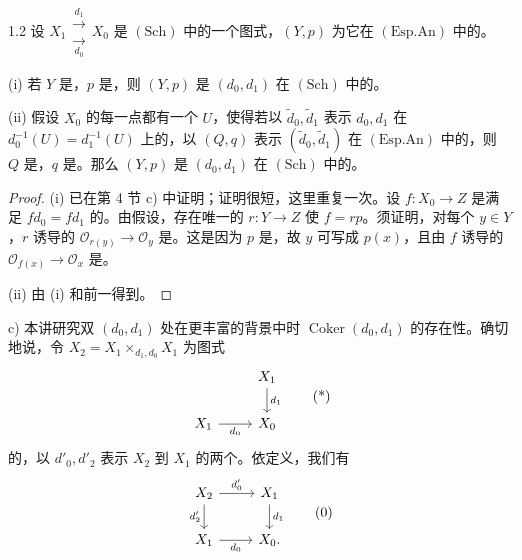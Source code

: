 \begin{SGAresult}{}{1.2}
设 $X_1\mathrel{\substack{\xrightarrow{d_1}\\[-.6ex]\xrightarrow[d_0]{}}}X_0$ 是 $(\mathrm{Sch})$ 中的一个图式，$(Y,p)$ 为它在 $(\mathrm{Esp.An})$ 中的。

(i) 若 $Y$ 是，$p$ 是，则 $(Y,p)$ 是 $(d_0,d_1)$ 在 $(\mathrm{Sch})$ 中的。

(ii) 假设 $X_0$ 的每一点都有一个 $U$，使得若以 $\widetilde d_0,\widetilde d_1$ 表示 $d_0,d_1$ 在 $d_0^{-1}(U)=d_1^{-1}(U)$ 上的，以 $(Q,q)$ 表示 $(\widetilde d_0,\widetilde d_1)$ 在 $(\mathrm{Esp.An})$ 中的，则 $Q$ 是，$q$ 是。那么 $(Y,p)$ 是 $(d_0,d_1)$ 在 $(\mathrm{Sch})$ 中的。
\end{SGAresult}
\begin{proof}
(i) 已在第 4 节 c) 中证明；证明很短，这里重复一次。设 $f:X_0\to Z$ 是满足 $fd_0=fd_1$ 的。由假设，存在唯一的 $r:Y\to Z$ 使 $f=rp$。须证明，对每个 $y\in Y$，$r$ 诱导的 $\mathcal O_{r(y)}\to\mathcal O_y$ 是。这是因为 $p$ 是，故 $y$ 可写成 $p(x)$，且由 $f$ 诱导的 $\mathcal O_{f(x)}\to\mathcal O_x$ 是。

(ii) 由 (i) 和前一得到。
\end{proof}
c) 本讲研究双 $(d_0,d_1)$ 处在更丰富的背景中时 $\operatorname{Coker}(d_0,d_1)$ 的存在性。确切地说，令 $X_2=X_1\times_{d_1,d_0}X_1$ 为图式
\[
\begin{tikzcd}
&X_1\arrow[d,"d_1"]\\
X_1\arrow[r,"d_0"']&X_0
\end{tikzcd}\tag{*}
\]
的，以 $d'_0,d'_2$ 表示 $X_2$ 到 $X_1$ 的两个。依定义，我们有
\[
\begin{tikzcd}
X_2\arrow[r,"d'_0"]\arrow[d,"d'_2"']&X_1\arrow[d,"d_1"]\\
X_1\arrow[r,"d_0"']&X_0.
\end{tikzcd}\tag{0}
\]
